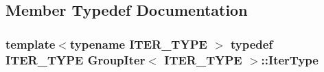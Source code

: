 \subsection{Member Typedef Documentation}
\hypertarget{structGroupIter_abe09fb339a76ba74ebdfea599aaaa63c}{
\subsubsection[{Iter\-Type}]{\setlength{\rightskip}{0pt plus 5cm}template$<$typename I\-T\-E\-R\-\_\-\-T\-Y\-P\-E $>$ typedef I\-T\-E\-R\-\_\-\-T\-Y\-P\-E {\bf Group\-Iter}$<$ I\-T\-E\-R\-\_\-\-T\-Y\-P\-E $>$\-::{\bf Iter\-Type}}}\label{structGroupIter_abe09fb339a76ba74ebdfea599aaaa63c}


